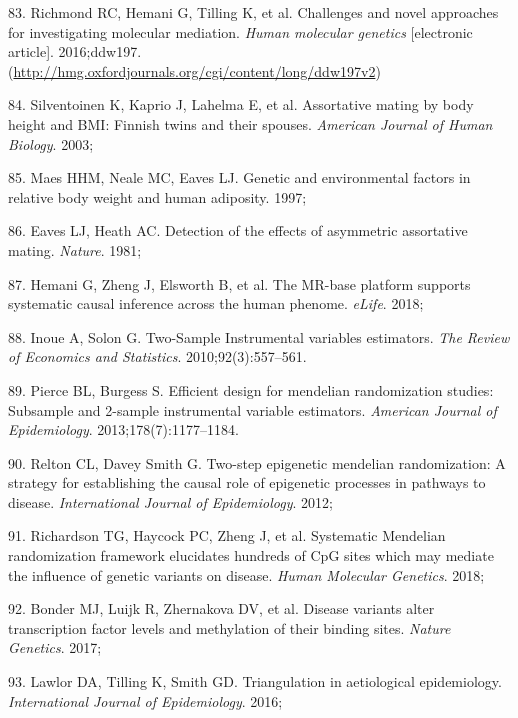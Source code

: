 \documentclass[11pt,twoside]{bristolthesis}
\newenvironment{cslreferences}%
  {}%
  {\par}
\begin{document}
\begin{cslreferences}
\leavevmode\hypertarget{ref-Richmond2016}{}%
83. Richmond RC, Hemani G, Tilling K, et al. Challenges and novel approaches for investigating molecular mediation. \emph{Human molecular genetics} {[}electronic article{]}. 2016;ddw197. (\url{http://hmg.oxfordjournals.org/cgi/content/long/ddw197v2})

\leavevmode\hypertarget{ref-Silventoinen2003}{}%
84. Silventoinen K, Kaprio J, Lahelma E, et al. Assortative mating by body height and BMI: Finnish twins and their spouses. \emph{American Journal of Human Biology}. 2003;

\leavevmode\hypertarget{ref-Maes1997}{}%
85. Maes HHM, Neale MC, Eaves LJ. Genetic and environmental factors in relative body weight and human adiposity. 1997;

\leavevmode\hypertarget{ref-Eaves1981}{}%
86. Eaves LJ, Heath AC. Detection of the effects of asymmetric assortative mating. \emph{Nature}. 1981;

\leavevmode\hypertarget{ref-Hemani2018}{}%
87. Hemani G, Zheng J, Elsworth B, et al. The MR-base platform supports systematic causal inference across the human phenome. \emph{eLife}. 2018;

\leavevmode\hypertarget{ref-Inoue2010}{}%
88. Inoue A, Solon G. Two-Sample Instrumental variables estimators. \emph{The Review of Economics and Statistics}. 2010;92(3):557--561.

\leavevmode\hypertarget{ref-Pierce2013}{}%
89. Pierce BL, Burgess S. Efficient design for mendelian randomization studies: Subsample and 2-sample instrumental variable estimators. \emph{American Journal of Epidemiology}. 2013;178(7):1177--1184.

\leavevmode\hypertarget{ref-Relton2012}{}%
90. Relton CL, Davey Smith G. Two-step epigenetic mendelian randomization: A strategy for establishing the causal role of epigenetic processes in pathways to disease. \emph{International Journal of Epidemiology}. 2012;

\leavevmode\hypertarget{ref-Richardson2018}{}%
91. Richardson TG, Haycock PC, Zheng J, et al. Systematic Mendelian randomization framework elucidates hundreds of CpG sites which may mediate the influence of genetic variants on disease. \emph{Human Molecular Genetics}. 2018;

\leavevmode\hypertarget{ref-Bonder2017}{}%
92. Bonder MJ, Luijk R, Zhernakova DV, et al. Disease variants alter transcription factor levels and methylation of their binding sites. \emph{Nature Genetics}. 2017;

\leavevmode\hypertarget{ref-Lawlor2016}{}%
93. Lawlor DA, Tilling K, Smith GD. Triangulation in aetiological epidemiology. \emph{International Journal of Epidemiology}. 2016;


\end{cslreferences}
\end{document}
